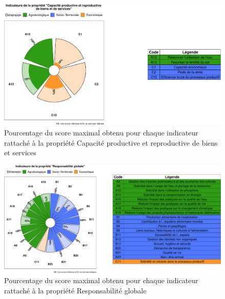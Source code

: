 \documentclass[]{article}
\begin{document}
\begin{figure}[H]

{\centering \includegraphics[width=1\linewidth]{report_files/figure-latex/unnamed-chunk-19-1} 

}

\caption{Pourcentage du score maximal obtenu pour chaque indicateur rattaché à la propriété Capacité productive et reproductive de biens et services}\label{fig:unnamed-chunk-19}
\end{figure}

\begin{figure}[H]

{\centering \includegraphics[width=1\linewidth]{report_files/figure-latex/unnamed-chunk-20-1} 

}

\caption{Pourcentage du score maximal obtenu pour chaque indicateur rattaché à la propriété Responsabilité globale}\label{fig:unnamed-chunk-20}
\end{figure}
\end{document}
